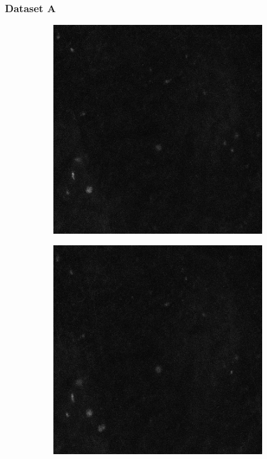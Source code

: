 	\subsubsection{Dataset A}
	\label{subsec:datasetA}
	\begin{figure}[h]
   		\begin{subfigure}{.32\textwidth}
   		\includegraphics[width=\textwidth]{images/series30green019}
   		\end{subfigure}%
   		\hfill
   		\begin{subfigure}{.32\textwidth}
   		\includegraphics[width=\textwidth]{images/series30green020}

\end{subfigure}
\end{figure}
